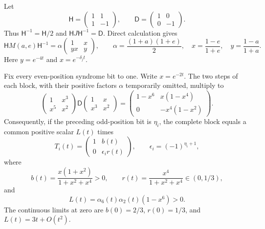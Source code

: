 Let
\[
 \mathsf H=\begin{pmatrix}1&1\\1&-1\end{pmatrix},\qquad
 \mathsf D=\begin{pmatrix}1&0\\0&-1\end{pmatrix}.
\]
Thus $\mathsf H^{-1}=\mathsf H/2$ and
$\mathsf HJ\mathsf H^{-1}=\mathsf D$. Direct calculation gives
\begin{equation}\label{eq:path-hadamard}
 \mathsf HM(a,e)\mathsf H^{-1}
 =\alpha\begin{pmatrix}1&x\\yx&y\end{pmatrix},\qquad
 \alpha=\frac{(1+a)(1+e)}2,\quad
 x=\frac{1-e}{1+e},\quad y=\frac{1-a}{1+a}.
\end{equation}
Here $y=e^{-4t}$ and $x=e^{-\delta_jt}$.

Fix every even-position syndrome bit to one. Write $x=e^{-2t}$.
The two steps of each block, with their positive factors $\alpha$
temporarily omitted, multiply to
\begin{equation}\label{eq:path-triangular}
 \begin{pmatrix}1&x^3\\x^5&x^2\end{pmatrix}
 \mathsf D
 \begin{pmatrix}1&x\\x^3&x^2\end{pmatrix}
 =\begin{pmatrix}1-x^6&x(1-x^4)\\0&-x^4(1-x^2)\end{pmatrix}.
\end{equation}
Consequently, if the preceding odd-position bit is $\eta_i$, the
complete block equals a common positive scalar $L(t)$ times
\[
 T_i(t)=\begin{pmatrix}1&b(t)\\0&\epsilon_i r(t)\end{pmatrix},
 \qquad \epsilon_i=(-1)^{\eta_i+1},
\]
where
\begin{equation}\label{eq:path-ratio}
 b(t)=\frac{x(1+x^2)}{1+x^2+x^4}>0,\qquad
 r(t)=\frac{x^4}{1+x^2+x^4}\in(0,1/3),
\end{equation}
and
\[
 L(t)=\alpha_6(t)\alpha_2(t)(1-x^6)>0.
\]
The continuous limits at zero are $b(0)=2/3$, $r(0)=1/3$, and
$L(t)=3t+O(t^2)$.

